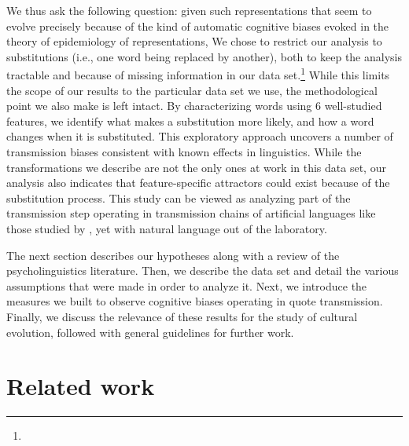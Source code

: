 \begin{new}
We thus ask the following question: given such representations that seem to evolve precisely because of the kind of automatic cognitive biases evoked in the theory of epidemiology of representations, 
We chose to restrict our analysis to substitutions (i.e., one word being replaced by another), both to keep the analysis tractable and because of missing information in our data set.\footnote{
}
While this limits the scope of our results to the particular data set we use, the methodological point we also make is left intact.  By characterizing words using 6 well-studied features, we identify what makes a substitution more likely, and how a word changes when it is substituted.
This exploratory approach uncovers a number of transmission biases consistent with known effects in linguistics.
While the transformations we describe are not the only ones at work in this data set, our analysis also indicates that feature-specific attractors could exist because of the substitution process.
This study can be viewed as analyzing part of the transmission step operating in transmission chains of artificial languages like those studied by \citet{kirby_cumulative_2008}, yet with natural language out of the laboratory.

The next section %
describes our hypotheses along with a review of the psycholinguistics literature.
Then, we describe the data set and detail the various assumptions that were made in order to analyze it.
Next, we introduce the measures we built to observe cognitive biases operating in quote transmission.
Finally, we discuss the relevance of these results for the study of cultural evolution, followed with general guidelines for further work.%
\end{new}


\section{Related work} %
\label{sec:related}

